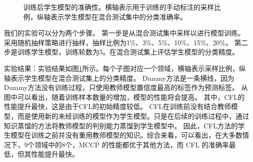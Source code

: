 \documentclass[fontset=macnew,UTF8]{article} %
\begin{document}
\begin{figure}[t]
{\begin{minipage}[b]{.3\linewidth}
		\end{minipage}
	}
	\caption{训练后学生模型的准确性。横轴表示用于训练的手动标注的采样比例，纵轴表示学生模型在混合测试集中的分类准确率。}
	\label{major_results}
\end{figure}

我们的实验可以分为两个步骤。 第一步是从混合测试集中采样以进行模型训练。采用随机抽样策略进行抽样，抽样比例为1\%、3\%、5\%、10\%、15\%、20\%\cite{shen2020multiple}。 第二步是训练学生模型，训练轮数为5。在混合测试集上评估学生模型的分类精度。

实验结果：实验结果如图\ref{major_results}所示。每个子图对应一个领域，横轴表示采样比例，纵轴表示学生模型在混合测试集上的分类精度。 Dummy方法是一条横线，因为Dummy方法没有训练过程，只使用教师模型置信度最高的标签作为预测标签。 从图中可以看出，随着训练样本数量的增加，模型的性能将会提高。 其中，CFL的性能提升最快，这是由于CFL的初始精度较低。 CFL在训练前没有结合教师模型，而是使用新的未经训练的模型作为学生模型。只是在后续的训练过程中，通过知识蒸馏的方法将教师模型的判别能力蒸馏到学生模型中。 因此，CFL方法的学生模型在训练之前并没有重用教师模型的知识。综合来看，可以看出，在大多数情况下，9个领域中的8个，MCCP 的性能都优于其他方法，而 CFL 的准确率最低，但其性能提升最快。
\end{document}
